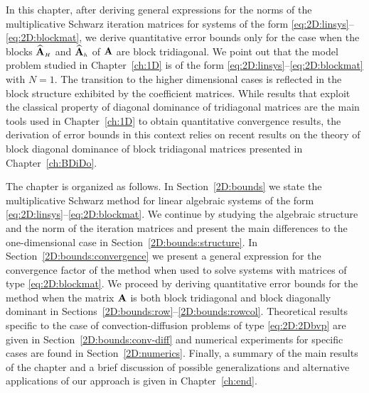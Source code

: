 In this chapter, after deriving general expressions for the norms of
the multiplicative Schwarz iteration matrices for systems of the form
\eqref{eq:2D:linsys}--\eqref{eq:2D:blockmat}, we derive quantitative error
bounds only for the case when the blocks $\widehat{\mathbf{A}}_{\scriptscriptstyle H}$ and $\widehat{\mathbf{A}}_{\scriptscriptstyle h}$ of $\mathbf{A}$ are
block tridiagonal. We point out that the model problem studied in
Chapter~\ref{ch:1D} is of the form \eqref{eq:2D:linsys}--\eqref{eq:2D:blockmat}
with $N=1$. The transition to the higher dimensional cases is reflected in the
block structure exhibited by the coefficient matrices.
While results that exploit the classical property of diagonal dominance
of tridiagonal matrices are the main tools used in Chapter~\ref{ch:1D} to
obtain quantitative convergence results, the derivation of error bounds in this
context relies on recent results on the theory of block diagonal dominance of
block tridiagonal matrices presented in Chapter~\ref{ch:BDiDo}.

The chapter is organized as follows. In Section~\ref{2D:bounds} we state the
multiplicative Schwarz method for linear algebraic systems of the form
\eqref{eq:2D:linsys}--\eqref{eq:2D:blockmat}. We continue by studying the
algebraic structure and the norm of the iteration matrices and present the main
differences to the one-dimensional case in Section~\ref{2D:bounds:structure}.
In Section~\ref{2D:bounds:convergence} we present a general expression for the
convergence factor of the method when used to solve systems with matrices of
type \eqref{eq:2D:blockmat}. We proceed by deriving quantitative error bounds
for the method when the matrix $\mathbf{A}$ is both block tridiagonal and
block diagonally dominant in Sections~\ref{2D:bounds:row}--\ref{2D:bounds:rowcol}. Theoretical results specific to the case of
convection-diffusion problems of type \eqref{eq:2D:2Dbvp} are given in
Section~\ref{2D:bounds:conv-diff} and numerical experiments for specific cases
are found in Section~\ref{2D:numerics}. Finally, a summary of the
main results of the chapter and a brief discussion of possible generalizations
and alternative applications of our approach is given in Chapter~\ref{ch:end}.

\newpage
